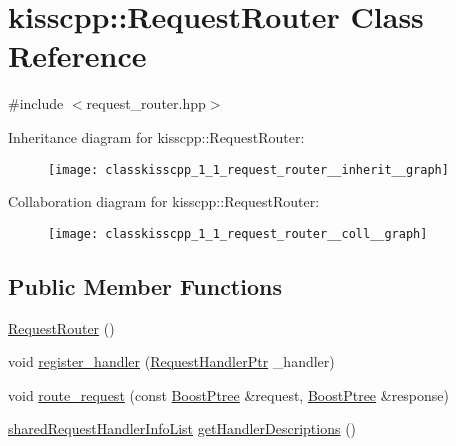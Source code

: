 \hypertarget{classkisscpp_1_1_request_router}{\section{kisscpp\-:\-:Request\-Router Class Reference}
\label{classkisscpp_1_1_request_router}
}


{\ttfamily \#include $<$request\-\_\-router.\-hpp$>$}



Inheritance diagram for kisscpp\-:\-:Request\-Router\-:
\nopagebreak
\begin{figure}[H]
\begin{center}
\leavevmode
\texttt{[image: classkisscpp\_1\_1\_request\_router\_\_inherit\_\_graph]}
\end{center}
\end{figure}


Collaboration diagram for kisscpp\-:\-:Request\-Router\-:
\nopagebreak
\begin{figure}[H]
\begin{center}
\leavevmode
\texttt{[image: classkisscpp\_1\_1\_request\_router\_\_coll\_\_graph]}
\end{center}
\end{figure}
\subsection*{Public Member Functions}
\begin{DoxyCompactItemize}
\item 
\hyperlink{classkisscpp_1_1_request_router_a3f894769b8eaac5829a078528d94450e}{Request\-Router} ()
\item 
void \hyperlink{classkisscpp_1_1_request_router_ad99c50deee2ddca6bed2277886ecd3fa}{register\-\_\-handler} (\hyperlink{namespacekisscpp_a21e40edcd4f1a3c7c1cc0015b576c8e5}{Request\-Handler\-Ptr} \-\_\-handler)
\item 
void \hyperlink{classkisscpp_1_1_request_router_a5b53460864642f4b4ea435a3297102a6}{route\-\_\-request} (const \hyperlink{boost__ptree_8hpp_ab36820650b8e0db36402aea80485633c}{Boost\-Ptree} \&request, \hyperlink{boost__ptree_8hpp_ab36820650b8e0db36402aea80485633c}{Boost\-Ptree} \&response)
\item 
\hyperlink{namespacekisscpp_aa107348bd263ff2c9358b497155d37b8}{shared\-Request\-Handler\-Info\-List} \hyperlink{classkisscpp_1_1_request_router_a90d1738f2e97b5e8dbc13b8ce524747c}{get\-Handler\-Descriptions} ()
\end{DoxyCompactItemize}


